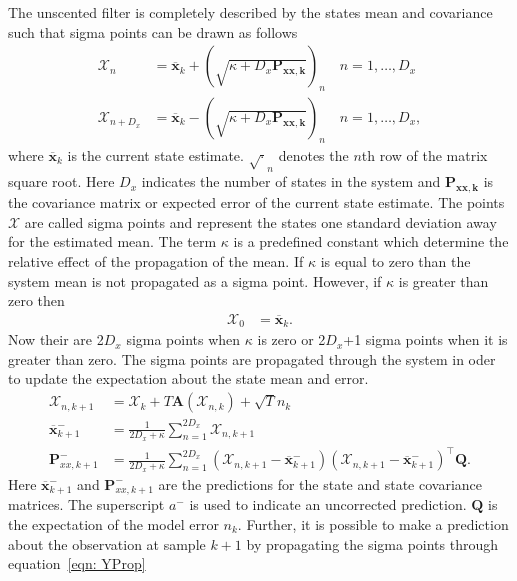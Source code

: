 The unscented filter is completely described by the states mean and covariance such that sigma points can be drawn as follows\begin{align}
\label{eqn: Unscented_Transform1}
\mathbf{\mathcal{X}}_{n} &= \mathbf{\overline{x}}_{k} + (\sqrt{\kappa+D_{x}\mathbf{P_{xx,k}}})_{n} \quad n=1,\hdots,D_x\\
\label{eqn: Unscented_Transform2}
\mathbf{\mathcal{X}}_{n+D_{x}} &= \mathbf{\overline{x}}_{k} - (\sqrt{\kappa+D_{x}\mathbf{P_{xx,k}}})_{n} \quad n=1,\hdots,D_x,
\end{align} where $\mathbf{\overline{x}}_{k}$ is the current state estimate. $\sqrt{\cdot}_{n}$ denotes the $n$th row of the matrix square root. Here $D_{x}$ indicates the number of states in the system and $\mathbf{P_{xx,k}}$ is the covariance matrix or expected error of the current state estimate. The points $\mathbf{\mathcal{X}}$ are called sigma points and represent the states one standard deviation away for the estimated mean. The term $\kappa$ is a predefined constant which determine the relative effect of the propagation of the mean. If $\kappa$ is equal to zero than the system mean is not propagated as a sigma point. However, if $\kappa$ is greater than zero then \begin{align}
\mathbf{\mathcal{X}}_{0} &= \mathbf{\overline{x}}_{k}.
\end{align} Now their are 2$D_{x}$ sigma points when $\kappa$ is zero or 2$D_{x}$+1 sigma points when it is greater than zero. The sigma points are propagated through the system in oder to update the expectation about the state mean and error. \begin{align}%
\mathbf{\mathcal{X}}_{n,k+1} &= \mathbf{\mathcal{X}}_{k}+ T\mathbf{A}(\mathbf{\mathcal{X}}_{n,k}) +\sqrt{T}{n}_{k}\\
\overline{\mathbf{x}}_{k+1}^{-} &= \frac{1}{2D_{x}+\kappa}\sum_{n=1}^{2D_{x}} \mathbf{\mathcal{X}}_{n,k+1}\\
\mathbf{P}_{xx,k+1}^{-} &= \frac{1}{2D_{x}+\kappa}\sum_{n=1}^{2D_{x}} (\mathbf{\mathcal{X}}_{n,k+1} -\mathbf{\overline{x}}_{k+1}^{-})(\mathbf{\mathcal{X}}_{n,k+1}-\mathbf{\overline{x}}_{k+1}^{-})^{\top} \mathbf{Q}.%
\end{align} Here $\overline{\mathbf{x}}_{k+1}^{-}$ and $\mathbf{P}_{xx,k+1}^{-}$ are the predictions for the state and state covariance matrices. The superscript $a^{-}$ is used to indicate an uncorrected prediction. $\mathbf{Q}$ is the expectation of the model error $n_{k}$. Further, it is possible to make a prediction about the observation at sample $k+1$ by propagating the sigma points through equation~\ref{eqn: YProp} \begin{align} %

\end{align}
